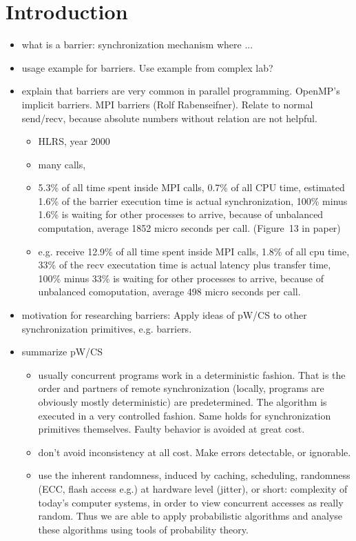 \documentclass[a4paper, 10pt]{article}
\begin{document}
\section{Introduction}
\begin{itemize}
	\item what is a barrier: synchronization mechanism where ...
	\item usage example for barriers. Use example from complex lab?
	\item explain that barriers are very common in parallel programming. OpenMP's\cite{openmp} implicit barriers. MPI barriers (Rolf Rabenseifner\cite{rab00}). Relate to normal send/recv, because absolute numbers without relation are not helpful.
		\begin{itemize}
			\item HLRS, year 2000
			\item many calls,
			\item 5.3\% of all time spent inside MPI calls, 0.7\% of all CPU time, estimated 1.6\% of the barrier execution time is actual synchronization, 100\% minus 1.6\% is waiting for other processes to arrive, because of unbalanced computation, average 1852 micro seconds per call. (Figure~13 in paper)
			\item e.g. receive 12.9\% of all time spent inside MPI calls, 1.8\% of all cpu time, 33\% of the recv executation time is actual latency plus transfer time, 100\% minus 33\% is waiting for other processes to arrive, because of unbalanced comoputation, average 498 micro seconds per call.
		\end{itemize}
	\item motivation for researching barriers: Apply ideas of pW/CS\cite{pwcs} to other synchronization primitives, e.g. barriers.
	\item summarize pW/CS
		\begin{itemize}
			\item usually concurrent programs work in a deterministic fashion. That is the order and partners of remote synchronization (locally, programs are obviously mostly deterministic) are predetermined. The algorithm is executed in a very controlled fashion. Same holds for synchronization primitives themselves. Faulty behavior is avoided at great cost.
			\item don't avoid inconsistency at all cost. Make errors detectable, or ignorable.
			\item use the inherent randomness\cite{mcg09}, induced by caching, scheduling, randomness (ECC, flash access e.g.) at hardware level (jitter), or short: complexity of today's computer systems, in order to view concurrent accesses as really random. Thus we are able to apply probabilistic algorithms and analyse these algorithms using tools of probability theory.

\end{itemize}
\end{itemize}
\end{document}
